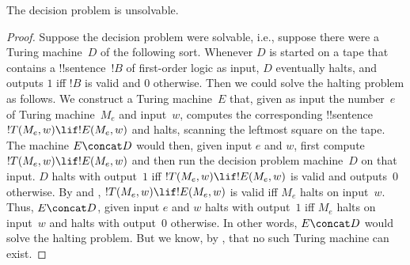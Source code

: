 \documentclass[../../../include/open-logic-section]{subfiles}
\begin{document}

\begin{thm}
The decision problem is unsolvable.  
\end{thm}

\begin{proof}
Suppose the decision problem were solvable, i.e., suppose there were a
Turing machine~$D$ of the following sort. Whenever $D$ is started on a
tape that contains a !!{sentence}~$!B$ of first-order logic as input,
$D$ eventually halts, and outputs $1$ iff $!B$ is valid and $0$
otherwise.  Then we could solve the halting problem as follows. We
construct a Turing machine~$E$ that, given as input the number~$e$ of
Turing machine~$M_e$ and input~$w$, computes the corresponding
!!{sentence}~$!T(M_e, w) \lif !E(M_e, w)$ and halts, scanning the
leftmost square on the tape.  The machine $E \concat D$ would then,
given input $e$ and $w$, first compute~$!T(M_e, w) \lif !E(M_e, w)$
and then run the decision problem machine~$D$ on that input.  $D$
halts with output~$1$ iff $!T(M_e, w) \lif !E(M_e, w)$ is valid and
outputs~$0$ otherwise. By  and
, $!T(M_e, w) \lif !E(M_e, w)$ is valid
iff $M_e$ halts on input~$w$. Thus, $E\concat D$, given input $e$ and
$w$ halts with output~$1$ iff $M_e$ halts on input~$w$ and halts with
output~$0$ otherwise. In other words, $E \concat D$ would solve the
halting problem.  But we know, by ,
that no such Turing machine can exist.
\end{proof}
\end{document}
